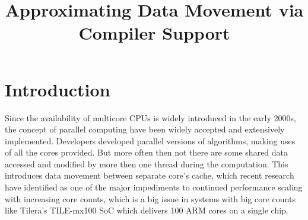 \documentclass[12pt,conference]{IEEEtran}
\begin{document}
%
\title{Approximating Data Movement via Compiler Support}


\author{
\and
{}
}



\maketitle






%
\IEEEpeerreviewmaketitle



\section{Introduction}

Since the availability of multicore CPUs is widely introduced in the
early 2000s, the concept of parallel computing have been widely accepted 
and extensively implemented. Developers developed parallel versions
of algorithms, making uses of all the cores provided. But more often then not
there are some shared data accessed and modified by more then one
thread during the computation. This introduces data movement between
separate core's cache, which recent research have identified as one of the major
impediments to continued performance scaling with increasing core counts, which
is a big issue in systems with big core counts like Tilera's TILE-mx100 SoC 
which delivers 100 ARM cores on a single chip.
\end{document}
